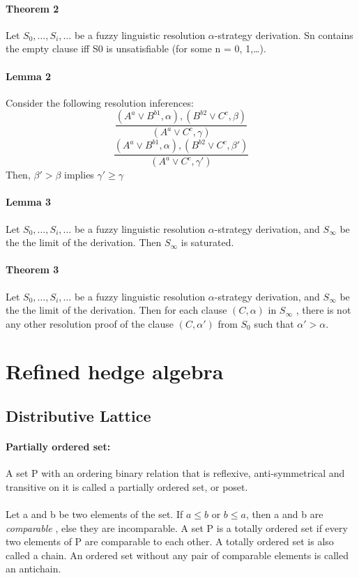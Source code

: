 \documentclass[26pt,fleqn,]{article}
\begin{document}
\paragraph{Theorem 2}
Let $S_{0},\ldots,S_{i},\ldots$ be a fuzzy linguistic resolution $\alpha$-strategy derivation.
Sn contains the empty clause iff S0 is unsatisfiable (for some n = 0, 1,\ldots).
\paragraph{Lemma 2} 
Consider the following resolution inferences:
\[ \frac{(A^{a} \vee B^{b1}, \alpha), (B^{b2} \vee C^{c}, \beta)} {(A^{a} \vee C^{c}, \gamma)}\]
\[\frac{(A^{a} \vee B^{b1}, \alpha), (B^{b2} \vee C^{c}, \beta')} {(A^{a} \vee C^{c}, \gamma')}\]
Then, $\beta' > \beta$ implies $\gamma' \ge \gamma$

\paragraph{Lemma 3} Let $S_{0},\ldots,S_{i},\ldots$ be a fuzzy linguistic 
resolution $\alpha$-strategy derivation, and $S_{\infty}$ be the the limit of the derivation.
Then $S_{\infty}$ is saturated.

\paragraph{Theorem 3} Let $S_{0},\ldots,S_{i},\ldots$ be a fuzzy linguistic 
resolution $\alpha$-strategy derivation, and $S_{\infty}$ be the the limit of the derivation. 
Then for each clause $(C, \alpha)$ in $S_{\infty}$ , there is not any other resolution proof 
of the clause $(C, \alpha')$ from $S_{0}$ such that $\alpha' > \alpha$.

\section{Refined hedge algebra}
\subsection{Distributive Lattice}
\paragraph{Partially ordered set: } A set P with an ordering binary relation that is reflexive, 
anti-symmetrical and transitive on it is called a partially ordered set, or poset.\\\\
Let a and b be two elements of the set. If \(a \le b\) or \(b \le a\), then a and b are {\em comparable}
, else they are incomparable. A set P is a totally ordered set if every two elements of P are comparable
to each other. A totally ordered set is also called a chain. An ordered set without any pair of 
comparable elements is called an antichain.\\\\
\end{document}
